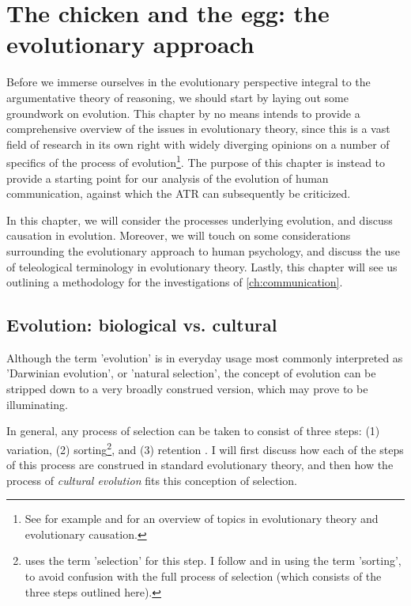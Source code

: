 \chapter{The chicken and the egg: the evolutionary approach}
\label{ch:evolution}

Before we immerse ourselves in the evolutionary perspective integral to the argumentative theory of reasoning, we should start by laying out some groundwork on evolution.
This chapter by no means intends to provide a comprehensive overview of the issues in evolutionary theory, since this is a vast field of research in its own right with widely diverging opinions on a number of specifics of the process of evolution\footnote{See for example \citet{Ariew02} and \citet{UllerLaland19} for an overview of topics in evolutionary theory and evolutionary causation.}.
The purpose of this chapter is instead to provide a starting point for our analysis of the evolution of human communication, against which the ATR can subsequently be criticized.

In this chapter, we will consider the processes underlying evolution, and discuss causation in evolution. Moreover, we will touch on some considerations surrounding the evolutionary approach to human psychology, and discuss the use of teleological terminology in evolutionary theory. Lastly, this chapter will see us outlining a methodology for the investigations of \cref{ch:communication}.

\section{Evolution: biological vs. cultural}
\label{sec:evo-bio-culture}

Although the term 'evolution' is in everyday usage most commonly interpreted as 'Darwinian evolution', or 'natural selection', the concept of evolution can be stripped down to a very broadly construed version, which may prove to be illuminating.

In general, any process of selection can be taken to consist of three steps: (1) variation, (2) sorting\footnote{\citet{Donahoe03} uses the term 'selection' for this step. I follow \citet{Heyes18} and \citet{S-P13} in using the term 'sorting', to avoid confusion with the full process of selection (which consists of the three steps outlined here).}, and (3) retention \citep{Donahoe03}. I will first discuss how each of the steps of this process are construed in standard evolutionary theory, and then how the process of \emph{cultural evolution} fits this conception of selection.

